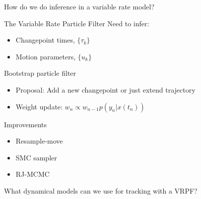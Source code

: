 \documentclass{beamer}
\begin{document}
\begin{frame}
How do we do inference in a variable rate model?
\end{frame}

\begin{frame}{The Variable Rate Particle Filter}
\pause Need to infer:
\begin{itemize}
 \item Changepoint times, $\{\tau_k\}$
 \item Motion parameters, $\{u_k\}$
\end{itemize}
\pause Bootstrap particle filter
\begin{itemize}
  \item Proposal: Add a new changepoint or just extend trajectory
  \item Weight update: $w_n \propto w_{n-1} p(y_n|x(t_n))$
\end{itemize}
\pause Improvements
\begin{itemize}
  \item Resample-move
  \item SMC sampler
  \item RJ-MCMC
\end{itemize}
\end{frame}

\begin{frame}
\end{frame}

\begin{frame}
What dynamical models can we use for tracking with a VRPF?
\end{frame}
\end{document}
